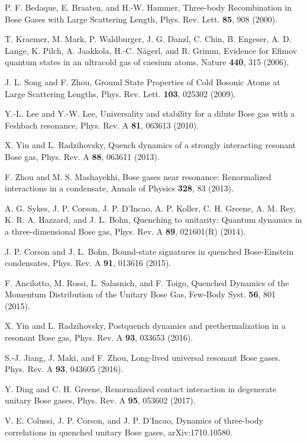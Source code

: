 \documentclass[aps,pra,twocolumn,showpacs,superscriptaddress]{revtex4}
\begin{document}
\begin{thebibliography}{100}
P. F. Bedaque, E. Braaten, and H.-W. Hammer,
Three-body Recombination in Bose Gases with Large Scattering Length,
Phys. Rev. Lett. {\bf{85}}, 908 (2000).

T. Kraemer, M. Mark, P. Waldburger, J. G. Danzl, C. Chin, B. Engeser, 
A. D. Lange, K. Pilch, A. Jaakkola, H.-C. N\"agerl, and R. Grimm,
Evidence for Efimov quantum states in an ultracold gas of caesium atoms,
Nature {\bf{440}}, 315 (2006).

J. L. Song and F. Zhou,
  Ground State Properties of Cold Bosonic Atoms at Large Scattering Lengths,
Phys. Rev. Lett. {\bf{103}}, 025302 (2009). 

Y.-L. Lee and Y.-W. Lee,
  Universality and stability for a dilute Bose gas with a Feshbach resonance,
Phys. Rev. A {\bf{81}}, 063613 (2010).

X. Yin and L. Radzihovsky,
Quench dynamics of a strongly interacting resonant Bose gas,
Phys. Rev. A {\bf{88}}, 063611 (2013).

F. Zhou and M. S. Mashayekhi,
  Bose gases near resonance: Renormalized interactions in a condensate,
Annals of Physics {\bf{328}}, 83 (2013).

    A. G. Sykes, J. P. Corson, J. P. D'Incao, A. P. Koller,
    C. H. Greene, A. M. Rey, K. R. A. Hazzard, and J. L. Bohn,
Quenching to unitarity: Quantum dynamics in a three-dimensional Bose gas,
Phys. Rev. A {\bf{89}}, 021601(R) (2014). 

J. P. Corson and J. L. Bohn,
  Bound-state signatures in quenched Bose-Einstein condensates,
Phys. Rev. A {\bf{91}}, 013616 (2015).

F. Ancilotto, M. Rossi, L. Salasnich, and F. Toigo,
Quenched Dynamics of the Momentum Distribution of the Unitary Bose Gas,
Few-Body Syst. {\bf{56}}, 801 (2015).

X. Yin and L. Radzihovsky,
Postquench dynamics and prethermalization in a resonant Bose gas,
Phys. Rev. A {\bf{93}}, 033653 (2016).

S.-J. Jiang, J. Maki, and F. Zhou,
Long-lived universal resonant Bose gases.
Phys. Rev. A {\bf{93}}, 043605 (2016).

Y. Ding and C. H. Greene,
Renormalized contact interaction in degenerate unitary Bose gases,
Phys. Rev. A {\bf{95}}, 053602 (2017).

    V. E. Colussi, J. P. Corson, and J. P. D'Incao,
  Dynamics of three-body correlations in quenched unitary Bose gases,
  arXiv:1710.10580.


\end{thebibliography}
\end{document}
